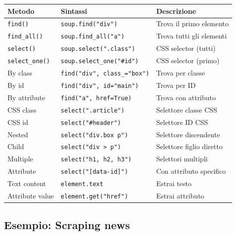 \begin{center}
\begin{tabular}{|l|l|p{6cm}|}
\hline
\textbf{Metodo} & \textbf{Sintassi} & \textbf{Descrizione} \\
\hline\hline
\texttt{find()} & \texttt{soup.find("div")} & Trova il primo elemento \\
\hline
\texttt{find\_all()} & \texttt{soup.find\_all("a")} & Trova tutti gli elementi \\
\hline
\texttt{select()} & \texttt{soup.select(".class")} & CSS selector (tutti) \\
\hline
\texttt{select\_one()} & \texttt{soup.select\_one("\#id")} & CSS selector (primo) \\
\hline
By class & \texttt{find("div", class\_="box")} & Trova per classe \\
\hline
By id & \texttt{find("div", id="main")} & Trova per ID \\
\hline
By attribute & \texttt{find("a", href=True)} & Trova con attributo \\
\hline
CSS class & \texttt{select(".article")} & Selettore classe CSS \\
\hline
CSS id & \texttt{select("\#header")} & Selettore ID CSS \\
\hline
Nested & \texttt{select("div.box p")} & Selettore discendente \\
\hline
Child & \texttt{select("div > p")} & Selettore figlio diretto \\
\hline
Multiple & \texttt{select("h1, h2, h3")} & Selettori multipli \\
\hline
Attribute & \texttt{select("[data-id]")} & Con attributo specifico \\
\hline
Text content & \texttt{element.text} & Estrai testo \\
\hline
Attribute value & \texttt{element.get("href")} & Estrai attributo \\
\hline
\end{tabular}
\end{center}

\subsection{Esempio: Scraping news}

